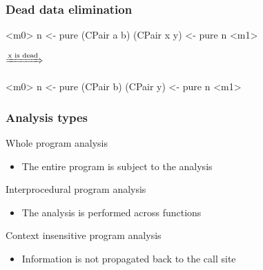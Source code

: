 \documentclass[bigger]{beamer}
\begin{document}
\begin{frame}[fragile]
\frametitle{Dead data elimination}

	\begin{center}
		\begin{minipage}{0.40\textwidth}
			\begin{haskellcode}
				<m0>
				n <- pure (CPair a b)
				(CPair x y) <- pure n
				<m1>
			\end{haskellcode}
		\end{minipage}
		\hfill
		$\xRightarrow{\text{x is dead}}$
		\hfill
		\begin{minipage}{0.35\textwidth}
			\begin{haskellcode}
				<m0>
				n <- pure (CPair b)
				(CPair y) <- pure n
				<m1>
			\end{haskellcode}
		\end{minipage}
	\end{center}

\end{frame}



\begin{frame}
	\frametitle{Analysis types}
	
	\begin{vfitemize}
		\item Whole program analysis\\
		\begin{itemize}
			\item[] The entire program is subject to the analysis
		\end{itemize}
	
		\item Interprocedural program analysis
		\begin{itemize}
			\item[] The analysis is performed across functions
		\end{itemize}
		
		\item Context insensitive program analysis
		\begin{itemize}
			\item Information is not propagated back to the call site
		\end{itemize}
	\end{vfitemize}
\end{frame}
\end{document}
